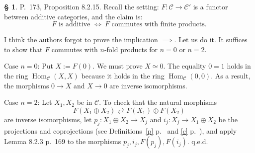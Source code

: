 \documentclass[12pt]{article}
\theoremstyle{remark}
\theoremstyle{definition}
\newtheorem{s}[thm]{\S}
\newcommand{\C}{\mathcal C}
\DeclareMathOperator{\Hom}{Hom}%
\begin{document}
\begin{s} 
P.~173, Proposition 8.2.15. Recall the setting: $F:\C\to\C'$ is a functor between additive categories, and the claim is: 
$$
F\text{ is additive }\iff\ F\text{ commutes with finite products}.
$$ 

I think the authors forgot to prove the implication $\implies$. Let us do it. It suffices to show that $F$ commutes with $n$-fold products for $n=0$ or $n=2$. 

Case $n=0$: Put $X:=F(0)$. We must prove $X\simeq 0$. The equality $0=1$ holds in the ring $\Hom_\C(X,X)$ because it holds in the ring $\Hom_\C(0,0)$. As a result, the morphisms $0\to X$ and $X\to 0$ are inverse isomorphisms. 

Case $n=2$: Let $X_1,X_2$ be in $\C$. To check that the natural morphisms 
%
\begin{equation}\label{173} 
F(X_1\oplus X_2)\rightleftarrows F(X_1)\oplus F(X_2)
\end{equation} 
%
are inverse isomorphisms, let $p_j:X_1\oplus X_2\to X_j$ and $i_j:X_j\to X_1\oplus X_2$ be the projections and coprojections (see Definitions~\ref{p} p.~\pageref{p} and \ref{c} p.~\pageref{c}), and apply Lemma 8.2.3 p.~169 to the morphisms $p_j,i_j,F(p_j),F(i_j)$. q.e.d.
\end{s}
%
%
\end{document}
